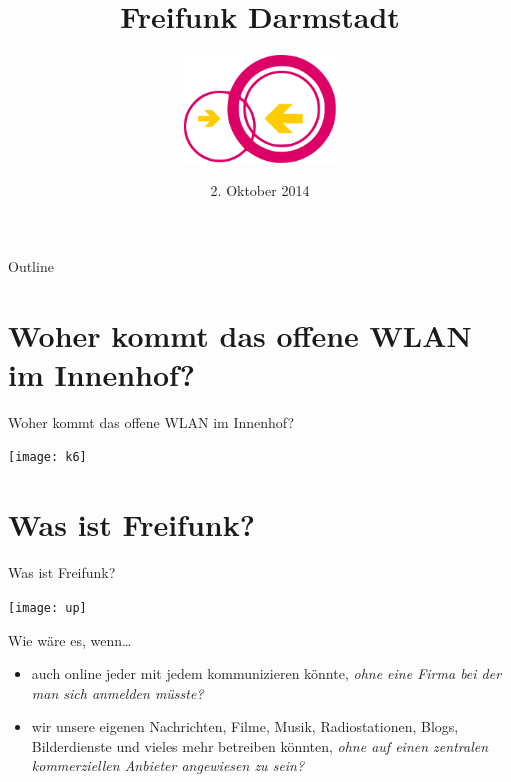 \documentclass{beamer}
\title{Freifunk Darmstadt}
\author{\includegraphics[width=4cm]{logo}}
\date{2. Oktober 2014}
\begin{document}
\begin{frame}
\maketitle
\end{frame}


\begin{frame}{Outline}
\tableofcontents
\end{frame}

\section{Woher kommt das offene WLAN im Innenhof?}
\begin{frame}{Woher kommt das offene WLAN im Innenhof?}
\vfill
\pause
\begin{center}
\texttt{[image: k6]}
\end{center}
\vfill
\end{frame}

\section{Was ist Freifunk?}
\begin{frame}{Was ist Freifunk?}
\vfill
\begin{center}
\texttt{[image: up]}
\end{center}
\vfill
Wie wäre es, wenn\ldots
\vfill
\begin{itemize}
\pause\item auch online jeder mit jedem kommunizieren könnte\pause , \textit{ohne eine Firma bei der man sich anmelden müsste?}
\vfill
\pause\item wir unsere eigenen Nachrichten, Filme, Musik, Radiostationen, Blogs, Bilderdienste und vieles mehr betreiben könnten\pause ,  \textit{ohne auf einen zentralen kommerziellen Anbieter angewiesen zu sein?}
\end{itemize}
\end{frame}

\end{document}
